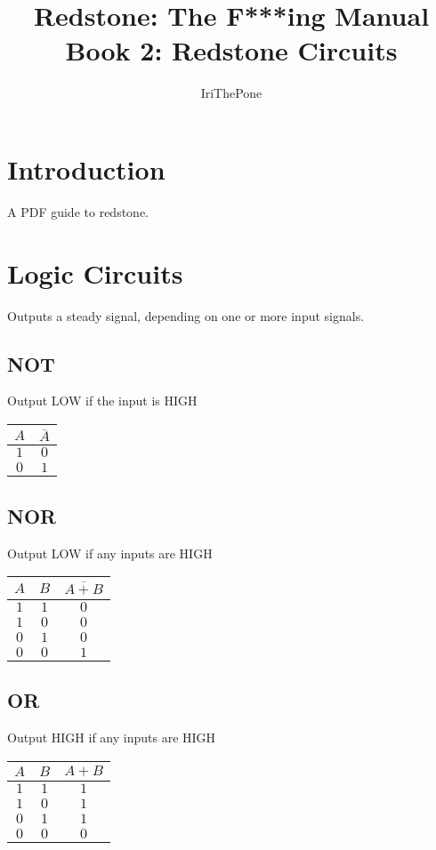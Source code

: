 \documentclass[12pt]{article}
\title{Redstone: The F***ing Manual\\{\Large Book 2: Redstone Circuits}}
\author{IriThePone}
\begin{document}
\maketitle
\pagebreak
\tableofcontents
\pagebreak

\section{Introduction}
A PDF guide to redstone.

\section{Logic Circuits}
Outputs a steady signal, depending on one or more input signals.  

\subsection{NOT}
Output LOW if the input is HIGH\bigskip\\
\begin{tabular}{|c|c|}\hline
$A$ & $\overline{A}$ \\\hline
$1$ & $0$ \\\hline
$0$ & $1$ \\\hline
\end{tabular}

\subsection{NOR}
Output LOW if any inputs are HIGH\bigskip\\
\begin{tabular}{|c|c|c|}\hline
$A$ & $B$ & $\overline{A+B}$ \\\hline
$1$ & $1$ & $0$ \\\hline
$1$ & $0$ & $0$ \\\hline
$0$ & $1$ & $0$ \\\hline
$0$ & $0$ & $1$ \\\hline
\end{tabular}

\subsection{OR}
Output HIGH if any inputs are HIGH \bigskip\\
\begin{tabular}{|c|c|c|}\hline
$A$ & $B$ & $A+B$ \\\hline
$1$ & $1$ & $1$ \\\hline
$1$ & $0$ & $1$ \\\hline
$0$ & $1$ & $1$ \\\hline
$0$ & $0$ & $0$ \\\hline
\end{tabular}
\end{document}
